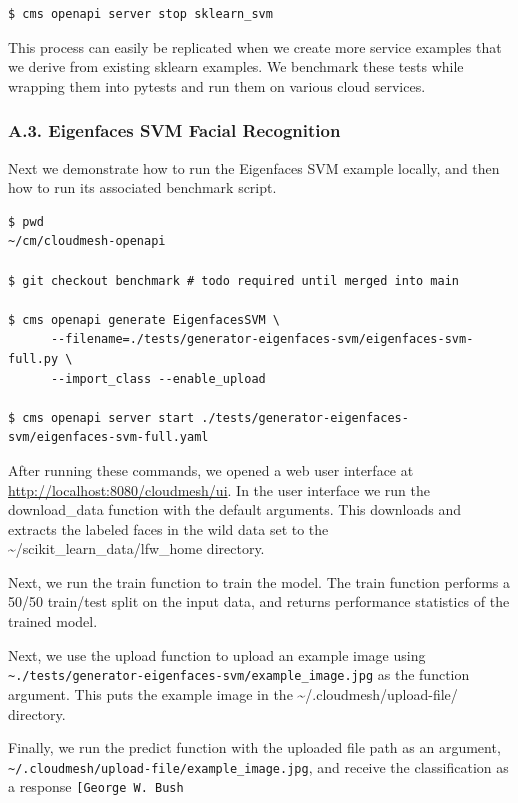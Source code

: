 \begin{verbatim}
$ cms openapi server stop sklearn_svm
\end{verbatim}

This process can easily be replicated when we create more service
examples that we derive from existing sklearn examples. We benchmark
these tests while wrapping them into pytests and run them on various
cloud services.

\hypertarget{a.3.-eigenfaces-svm-facial-recognition}{%
\subsubsection{A.3. Eigenfaces SVM Facial
Recognition}\label{a.3.-eigenfaces-svm-facial-recognition}}

Next we demonstrate how to run the Eigenfaces SVM example locally, and
then how to run its associated benchmark script.

\begin{verbatim}
$ pwd
~/cm/cloudmesh-openapi

$ git checkout benchmark # todo required until merged into main

$ cms openapi generate EigenfacesSVM \
      --filename=./tests/generator-eigenfaces-svm/eigenfaces-svm-full.py \
      --import_class --enable_upload

$ cms openapi server start ./tests/generator-eigenfaces-svm/eigenfaces-svm-full.yaml
\end{verbatim}

After running these commands, we opened a web user interface at
\url{http://localhost:8080/cloudmesh/ui}. In the user interface we run
the download\_data function with the default arguments. This downloads
and extracts the labeled faces in the wild data set to the
\textasciitilde/scikit\_learn\_data/lfw\_home directory.

Next, we run the train function to train the model. The train function
performs a 50/50 train/test split on the input data, and returns
performance statistics of the trained model.

Next, we use the upload function to upload an example image using
\texttt{\textasciitilde{}./tests/generator-eigenfaces-svm/example\_image.jpg}
as the function argument. This puts the example image in the
\textasciitilde/.cloudmesh/upload-file/ directory.

Finally, we run the predict function with the uploaded file path as an
argument,
\texttt{\textasciitilde{}/.cloudmesh/upload-file/example\_image.jpg},
and receive the classification as a response
\texttt{{[}\textquotesingle{}George\ W.\ Bush\textquotesingle{}{]}}

